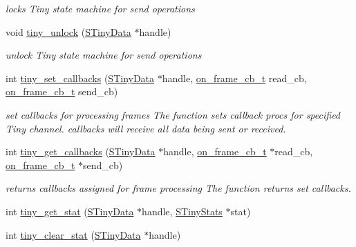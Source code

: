 \begin{DoxyCompactItemize}
\begin{DoxyCompactList}\small\item\em locks Tiny state machine for send operations \end{DoxyCompactList}\item 
void \hyperlink{group__ADVANCED__API_gae4bfad55a4ef5814a5af50f044f6d7cd}{tiny\+\_\+unlock} (\hyperlink{structSTinyData}{S\+Tiny\+Data} $\ast$handle)
\begin{DoxyCompactList}\small\item\em unlock Tiny state machine for send operations \end{DoxyCompactList}\item 
int \hyperlink{group__ADVANCED__API_gac562103dd1699b82fddf29dccdc0ec7c}{tiny\+\_\+set\+\_\+callbacks} (\hyperlink{structSTinyData}{S\+Tiny\+Data} $\ast$handle, \hyperlink{tiny__layer2_8h_ad6bf709565b8aecb9e6ecf196f219d54}{on\+\_\+frame\+\_\+cb\+\_\+t} read\+\_\+cb, \hyperlink{tiny__layer2_8h_ad6bf709565b8aecb9e6ecf196f219d54}{on\+\_\+frame\+\_\+cb\+\_\+t} send\+\_\+cb)
\begin{DoxyCompactList}\small\item\em set callbacks for processing frames The function sets callback procs for specified Tiny channel. callbacks will receive all data being sent or received. \end{DoxyCompactList}\item 
int \hyperlink{group__ADVANCED__API_gabe38a1f81966f6901eb2f6969b568298}{tiny\+\_\+get\+\_\+callbacks} (\hyperlink{structSTinyData}{S\+Tiny\+Data} $\ast$handle, \hyperlink{tiny__layer2_8h_ad6bf709565b8aecb9e6ecf196f219d54}{on\+\_\+frame\+\_\+cb\+\_\+t} $\ast$read\+\_\+cb, \hyperlink{tiny__layer2_8h_ad6bf709565b8aecb9e6ecf196f219d54}{on\+\_\+frame\+\_\+cb\+\_\+t} $\ast$send\+\_\+cb)
\begin{DoxyCompactList}\small\item\em returns callbacks assigned for frame processing The function returns set callbacks. \end{DoxyCompactList}\item 
int \hyperlink{group__ADVANCED__API_ga5f61774b2027a91f772f31d943acdd3f}{tiny\+\_\+get\+\_\+stat} (\hyperlink{structSTinyData}{S\+Tiny\+Data} $\ast$handle, \hyperlink{structSTinyStats}{S\+Tiny\+Stats} $\ast$stat)
\item 
int \hyperlink{group__ADVANCED__API_gac75ee03ea3691b0a8bf842d764b342d9}{tiny\+\_\+clear\+\_\+stat} (\hyperlink{structSTinyData}{S\+Tiny\+Data} $\ast$handle)
\end{DoxyCompactItemize}


